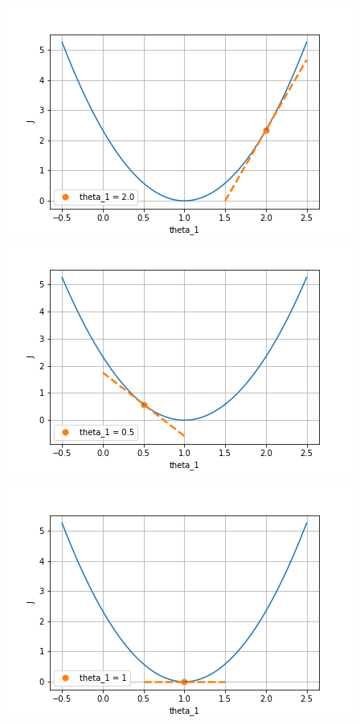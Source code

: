 \begin{flushleft}
    \includegraphics[scale=0.5]{images/partial derivative.png}
    \includegraphics[scale=0.5]{images/partial derivative_1.png}
\end{flushleft}
\begin{center}
    \includegraphics[scale=0.5]{images/partial derivative_2.png}
\end{center}
